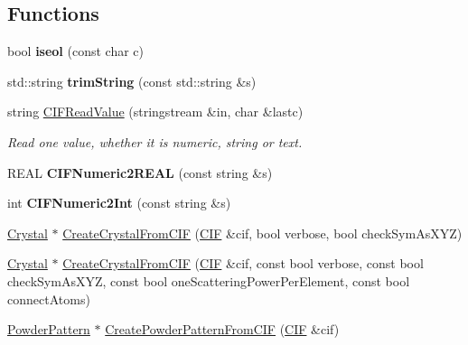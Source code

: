 \subsection*{Functions}
\begin{DoxyCompactItemize}
\item 
\mbox{\label{namespace_obj_cryst_ab265a56888073441f6faf3d62e11ce58}} 
bool {\bfseries iseol} (const char c)
\item 
\mbox{\label{namespace_obj_cryst_ade75a8148f356b0b6d2f6487eb01df59}} 
std\+::string {\bfseries trim\+String} (const std\+::string \&s)
\item 
\mbox{\label{namespace_obj_cryst_a881d65640ac0b90c47feb38e21bc942d}} 
string \mbox{\hyperlink{namespace_obj_cryst_a881d65640ac0b90c47feb38e21bc942d}{C\+I\+F\+Read\+Value}} (stringstream \&in, char \&lastc)
\begin{DoxyCompactList}\small\item\em Read one value, whether it is numeric, string or text. \end{DoxyCompactList}\item 
\mbox{\label{namespace_obj_cryst_a50e44842aedbbac577b532796f4f134a}} 
R\+E\+AL {\bfseries C\+I\+F\+Numeric2\+R\+E\+AL} (const string \&s)
\item 
\mbox{\label{namespace_obj_cryst_a2fc377a8295770783d23e0d11863f4ad}} 
int {\bfseries C\+I\+F\+Numeric2\+Int} (const string \&s)
\item 
\mbox{\hyperlink{class_obj_cryst_1_1_crystal}{Crystal}} $\ast$ \mbox{\hyperlink{namespace_obj_cryst_a9d17f1da70d6fa8dcdd0d7ed4fb8aa17}{Create\+Crystal\+From\+C\+IF}} (\mbox{\hyperlink{class_obj_cryst_1_1_c_i_f}{C\+IF}} \&cif, bool verbose, bool check\+Sym\+As\+X\+YZ)
\item 
\mbox{\hyperlink{class_obj_cryst_1_1_crystal}{Crystal}} $\ast$ \mbox{\hyperlink{namespace_obj_cryst_ababd3e4af050e9622950fa3704021332}{Create\+Crystal\+From\+C\+IF}} (\mbox{\hyperlink{class_obj_cryst_1_1_c_i_f}{C\+IF}} \&cif, const bool verbose, const bool check\+Sym\+As\+X\+YZ, const bool one\+Scattering\+Power\+Per\+Element, const bool connect\+Atoms)
\item 
\mbox{\hyperlink{class_obj_cryst_1_1_powder_pattern}{Powder\+Pattern}} $\ast$ \mbox{\hyperlink{namespace_obj_cryst_adbcc0e73ad99ff2376a70f56f81366ed}{Create\+Powder\+Pattern\+From\+C\+IF}} (\mbox{\hyperlink{class_obj_cryst_1_1_c_i_f}{C\+IF}} \&cif)

\end{DoxyCompactItemize}
